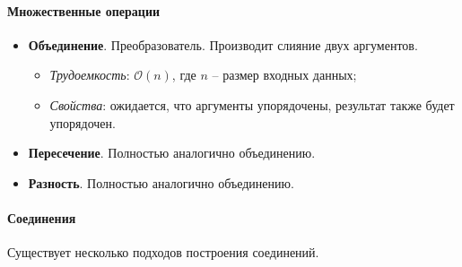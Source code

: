 \paragraph{Множественные операции}

\begin{itemize}
	\item \textbf{Объединение}. Преобразователь. Производит слияние двух аргументов.
	      \begin{itemize}
		      \item \textit{Трудоемкость}: $\mathcal{O}(n)$, где $n$ -- размер входных данных;
		      \item \textit{Свойства}: ожидается, что аргументы упорядочены, результат также будет
		            упорядочен.
	      \end{itemize}
	\item \textbf{Пересечение}. Полностью аналогично объединению.
	\item \textbf{Разность}. Полностью аналогично объединению.
\end{itemize}

\paragraph{Соединения}

Существует несколько подходов построения соединений.

